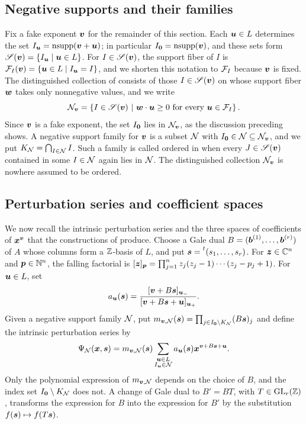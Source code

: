 \subsection{Negative supports and their families}

Fix a fake exponent \(\boldsymbol{v}\) for the remainder of this section.
Each \(\boldsymbol{u}\in L\) determines the set \(I_{\boldsymbol{u}}=\operatorname{nsupp}(\boldsymbol{v}+\boldsymbol{u})\); in particular \(I_{\boldsymbol{0}}=\operatorname{nsupp}(\boldsymbol{v})\), and these sets form \(\mathscr S(\boldsymbol{v})=\{I_{\boldsymbol{u}}\mid\boldsymbol{u}\in L\}\).
For \(I\in\mathscr S(\boldsymbol{v})\), the support fiber of \(I\) is \(\mathcal F_I(\boldsymbol{v})=\{\boldsymbol{u}\in L\mid I_{\boldsymbol{u}}=I\}\), and we shorten this notation to \(\mathcal F_I\) because \(\boldsymbol{v}\) is fixed.
The distinguished collection of \cite[Section~3]{OS25} consists of those \(I\in\mathscr S(\boldsymbol{v})\) on whose support fiber \(\boldsymbol{w}\) takes only nonnegative values, and we write
\[
	\mathcal N_{\boldsymbol{v}}
	=
	\left\{
	I\in\mathscr S(\boldsymbol{v})
	\ \middle|\
	\boldsymbol{w}\cdot\boldsymbol{u}\geq0
	\text{ for every }\boldsymbol{u}\in\mathcal F_I
	\right\}.
\]
Since \(\boldsymbol{v}\) is a fake exponent, the set \(I_{\boldsymbol{0}}\) lies in \(\mathcal N_{\boldsymbol{v}}\), as the discussion preceding \cite[Definition~3.1]{OS25} shows.
A negative support family for \(\boldsymbol{v}\) is a subset \(\mathcal N\) with \(I_{\boldsymbol{0}}\in\mathcal N\subseteq\mathcal N_{\boldsymbol{v}}\), and we put \(K_{\mathcal N}=\bigcap_{I\in\mathcal N}I\).
Such a family is called ordered in \cite[Definition~3.1]{OS25} when every \(J\in\mathscr S(\boldsymbol{v})\) contained in some \(I\in\mathcal N\) again lies in \(\mathcal N\).
The distinguished collection \(\mathcal N_{\boldsymbol{v}}\) is nowhere assumed to be ordered.

\subsection{Perturbation series and coefficient spaces}

We now recall the intrinsic perturbation series and the three spaces of coefficients of \(\boldsymbol{x}^{\boldsymbol{v}}\) that the constructions of \cite{OS25} produce.
Choose a Gale dual \(B=(\boldsymbol{b}^{(1)},\ldots,\boldsymbol{b}^{(r)})\) of \(A\) whose columns form a \(\mathbb Z\)-basis of \(L\), and put \(\boldsymbol{s}=\prescript{t}{}{(s_1,\ldots,s_r)}\).
For \(\boldsymbol{z}\in\mathbb C^n\) and \(\boldsymbol{p}\in\mathbb N^n\), the falling factorial is \([\boldsymbol{z}]_{\boldsymbol{p}} = \prod_{j=1}^n z_j(z_j-1)\cdots(z_j-p_j+1)\).
For \(\boldsymbol{u}\in L\), set
\[
	a_{\boldsymbol{u}}(\boldsymbol{s})
	=
	\frac{[\boldsymbol{v}+B\boldsymbol{s}]_{\boldsymbol{u}_-}}
	{[\boldsymbol{v}+B\boldsymbol{s}+\boldsymbol{u}]_{\boldsymbol{u}_+}}.
\]
Given a negative support family \(\mathcal N\), put \(m_{\boldsymbol{v},\mathcal N}(\boldsymbol{s}) = \prod_{j\in I_{\boldsymbol{0}}\setminus K_{\mathcal N}}(B\boldsymbol{s})_j\) and define the intrinsic perturbation series by
\[
	\Psi_{\mathcal N}(\boldsymbol{x},\boldsymbol{s})
	=
	m_{\boldsymbol{v},\mathcal N}(\boldsymbol{s})
	\sum_{\substack{\boldsymbol{u}\in L\\I_{\boldsymbol{u}}\in\mathcal N}}
	a_{\boldsymbol{u}}(\boldsymbol{s})\boldsymbol{x}^{\boldsymbol{v}+B\boldsymbol{s}+\boldsymbol{u}}.
\]
Only the polynomial expression of \(m_{\boldsymbol{v},\mathcal N}\) depends on the choice of \(B\), and the index set \(I_{\boldsymbol{0}}\setminus K_{\mathcal N}\) does not.
A change of Gale dual to \(B'=BT\), with \(T\in\operatorname{GL}_r(\mathbb Z)\), transforms the expression for \(B\) into the expression for \(B'\) by the substitution \(f(\boldsymbol{s})\mapsto f(T\boldsymbol{s})\).

